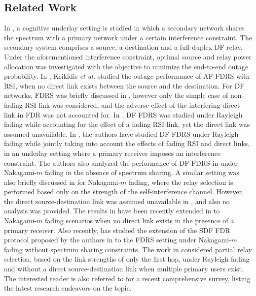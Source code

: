 \documentclass[10pt,journal]{IEEEtran}
\begin{document}
\subsection{Related Work}
In \cite{201210_TWC_Cognitive_FDR_Daesik_DF}, a cognitive underlay setting is studied in which a secondary network shares the spectrum with a primary network under a certain interference constraint. The secondary system comprises a source, a destination and a full-duplex DF relay. Under the aforementioned interference constraint, optimal source and relay power allocation was investigated with the objective to minimize the end-to-end outage probability. In \cite{201206_ICC_Krikidis_FDR_Selection_AF,201212_TWC_Krikidis_FDR_Selection_AF}, Krikidis \emph{et al.} studied the outage performance of \ac{AF} \ac{FDRS} with \ac{RSI}, when no direct link exists between the source and the destination. For \ac{DF} networks, \ac{FDRS} was briefly discussed in \cite{201012_EL_Rui_FDR_Selection_DF}, however only the simple case of non-fading \ac{RSI} link was considered, and the adverse effect of the interfering direct link in \ac{FDR} was not accounted for. In \cite{201406_ICC14_FDRS_Zhong}, \ac{DF} \ac{FDRS} was studied under Rayleigh fading while accounting for the effect of a fading \ac{RSI} link, yet the direct link was assumed unavailable. In \cite{Khafagy_CogFDRS_ICCW15}, the authors have studied \ac{DF} \ac{FDRS} under Rayleigh fading while jointly taking into account the effects of fading \ac{RSI} and direct links, in an underlay setting where a primary receiver imposes an interference constraint. The authors also analyzed the performance of \ac{DF} \ac{FDRS} in \cite{Khafagy_FDRS_CAMAD15} under Nakagami-$m$ fading in the absence of spectrum sharing. A similar setting was also briefly  discussed in \cite{201505_Hanzo_RS_Cognitive} for Nakagami-$m$ fading, where the relay selection is performed based only on the strength of the self-interference channel. However, the direct source-destination link was assumed unavailable  in \cite{201505_Hanzo_RS_Cognitive}, and also no analysis was provided. The results in \cite{201406_ICC14_FDRS_Zhong} have been recently extended in \cite{201510_TVT_FDRS_Zhong} to Nakagami-$m$ fading scenarios when no direct link exists in the presence of a primary receiver. Also recently, \cite{201602_IET_Wang_FDRS} has studied the extension of the \ac{SDF} \ac{FDR} protocol proposed by the authors in \cite{6510556,2015XX_TWC_Khafagy_FDR} to the \ac{FDRS} setting under Nakagami-$m$ fading without spectrum sharing constraints. The work in\cite{201701_SigTelCom} considered partial relay selection, based on the link strengths of only the first hop, under Rayleigh fading and without a direct source-destination link when multiple primary users exist. The interested reader is also referred to \cite{2017XX_SurvTut_RS_Cognitive} for a recent comprehensive survey, listing the latest research endeavors on the topic.
\end{document}
